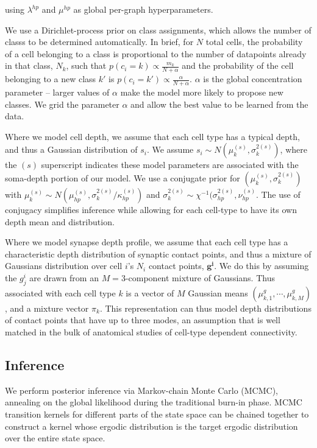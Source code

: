 \documentclass{article}
\renewcommand{\vec}[1]{\mathbf{#1}}
\begin{document}
using  $\lambda^{hp}$ and $\mu^{hp}$ as global per-graph hyperparameters. 

We use a Dirichlet-process prior on class assignments, which allows
the number of classs to be determined automatically. In brief, for $N$
total cells, the probability of a cell belonging to a class is
proportional to the number of datapoints already in that class, $N_k$,
such that $p(c_i = k) \propto \frac{m_k}{N + \alpha}$ and the
probability of the cell belonging to a new class $k'$ is $p(c_i = k')
\propto \frac{\alpha}{N + \alpha}$. $\alpha$ is the global
concentration parameter -- larger values of $\alpha$ make the model
more likely to propose new classes. We grid the parameter $\alpha$ and
allow the best value to be learned from the data.


Where we model cell depth, we assume that 
each cell type has a typical depth, and thus a Gaussian distribution
of $s_i$. We assume $s_i \sim N(\mu^{(s)}_k,
\sigma^{2(s)}_k)$, where the $(s)$ superscript indicates
these model parameters are associated with the soma-depth 
portion of our model.  We use a conjugate prior for $(\mu^{(s)}_k, \sigma^{2(s)}_k)$ with
$\mu^{(s)}_k \sim N(\mu^{(s)}_{hp}, \sigma^{2(s)}_k/ \kappa^{(s)}_{hp})$ and $\sigma^{2(s)}_k \sim
\chi^{-1}(\sigma^{2(s)}_{hp}, \nu^{(s)}_{hp}$. The use of conjugacy simplifies inference while allowing for each cell-type to have its own depth mean and distribution. 

Where we model synapse depth profile, we assume that each cell
type has a characteristic depth distribution of synaptic contact points, and thus
a mixture of Gaussians distribution over cell $i$’s $N_i$ contact points, $\vec{g^i}$.
We do this by assuming the $g^i_j$
are drawn from an $M=3$-component mixture of Gaussians. Thus associated with each cell type $k$ is a vector
of $M$ Gaussian means $(\mu^g_{k,1}, \cdots, \mu^g_{k, M})$, and a
mixture vector $\pi_k$.  This representation can thus model depth distributions of contact points that have up to three modes, an assumption that is well matched in the bulk of anatomical studies of cell-type dependent connectivity.


\subsection*{Inference} 
We perform posterior inference via Markov-chain Monte Carlo (MCMC),
annealing on the global likelihood during the traditional burn-in
phase. MCMC transition kernels for different parts of the state space
can be chained together to construct a kernel whose ergodic
distribution is the target ergodic distribution over the entire state space. 
\end{document}
